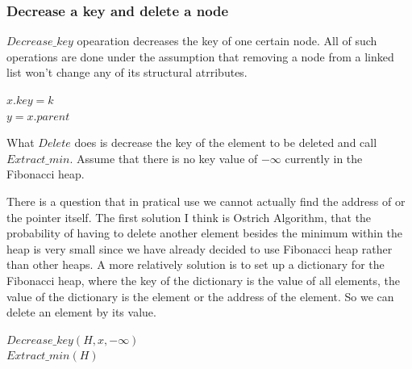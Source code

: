 \documentclass[catalog.tex]{subfiles}
\begin{document}
\subsubsection*{Decrease a key and delete a node}
$Decrease\_key$ opearation decreases the key of one certain node. All of such operations are done under the assumption that removing a node from a linked list won't change any of its structural atrributes.
\begin{Algorithm}
	\BlankLine
	$x.key=k$ \\
	$y=x.parent$ \\ 
\end{Algorithm}
\par What $Delete$ does is decrease the key of the element to be deleted and call $Extract\_min$. Assume that there is no key value of $-\infty$ currently
in the Fibonacci heap.
\par There is a question that in pratical use we cannot actually find the address of or the pointer itself. The first solution I think is Ostrich Algorithm, that the probability of having to delete another element besides the minimum within the heap is very small since we have already decided to use Fibonacci heap rather than other heaps. A more relatively solution is to set up a dictionary for the Fibonacci heap, where the key of the dictionary is the value of all elements, the value of the dictionary is the element or the address of the element. So we can delete an element by its value.

\begin{Algorithm}[Delete($H,x$)\label{alg:\currfilebase_union}]
	$Decrease\_key(H,x,-\infty)$ \\
	$Extract\_min(H)$
\end{Algorithm}
\end{document}
